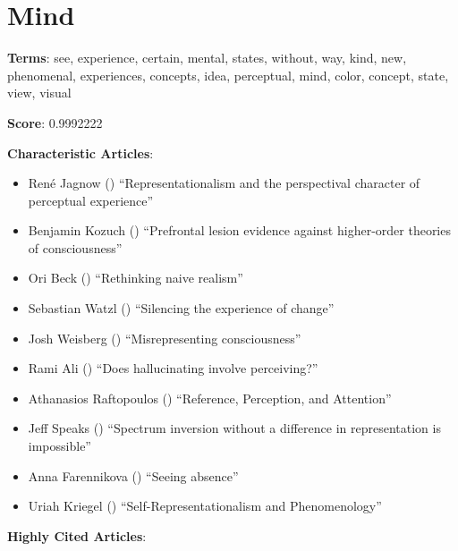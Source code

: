 \documentclass[
  10pt,
  letterpaper,
  DIV=11,
  numbers=noendperiod,
  twoside]{scrartcl}
\providecommand{\tightlist}{%
  \setlength{\itemsep}{0pt}\setlength{\parskip}{0pt}}\usepackage{longtable,booktabs,array}
\begin{document}
\section{Mind}\label{mind}

\textbf{Terms}: see, experience, certain, mental, states, without, way,
kind, new, phenomenal, experiences, concepts, idea, perceptual, mind,
color, concept, state, view, visual

\textbf{Score}: 0.9992222

\textbf{Characteristic Articles}:

\begin{itemize}
\tightlist
\item
  René Jagnow ()
  ``Representationalism and the perspectival character of perceptual
  experience''
\item
  Benjamin Kozuch () ``Prefrontal
  lesion evidence against higher-order theories of consciousness''
\item
  Ori Beck () ``Rethinking naive
  realism''
\item
  Sebastian Watzl () ``Silencing
  the experience of change''
\item
  Josh Weisberg ()
  ``Misrepresenting consciousness''
\item
  Rami Ali () ``Does
  hallucinating involve perceiving?''
\item
  Athanasios Raftopoulos ()
  ``Reference, Perception, and Attention''
\item
  Jeff Speaks () ``Spectrum
  inversion without a difference in representation is impossible''
\item
  Anna Farennikova () ``Seeing
  absence''
\item
  Uriah Kriegel ()
  ``Self-Representationalism and Phenomenology''
\end{itemize}

\textbf{Highly Cited Articles}:
\end{document}
